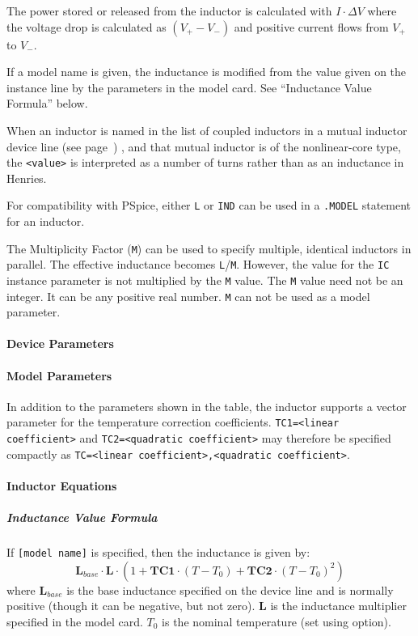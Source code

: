 \begin{Device}
The power stored or released from the inductor is calculated 
with $I \cdot \Delta V$ where the voltage drop is calculated as $(V_+ - V_-)$ 
and positive current flows from $V_+$ to $V_-$.

If a model name is given, the inductance is modified from the value
given on the instance line by the parameters in the model card.  See
``Inductance Value Formula'' below.

When an inductor is named in the list of coupled inductors in a mutual
inductor device line (see page~\pageref{MutualInductor}) , and that
mutual inductor is of the nonlinear-core type, the \verb+<value>+ is
interpreted as a number of turns rather than as an inductance in
Henries.

For compatibility with PSpice, either \texttt{L} or \texttt{IND} can be used in a
\texttt{.MODEL} statement for an inductor. 

The Multiplicity Factor (\texttt{M}) can be used to specify multiple, identical 
inductors in parallel. The effective inductance becomes \texttt{L}/\texttt{M}.
However, the value for the \texttt{IC} instance parameter is not multiplied by 
the \texttt{M} value. The \texttt{M} value need not be an integer.  It can be 
any positive real number. \texttt{M} can not be used as a model parameter.

\end{Device}

\newpage

\paragraph{Device Parameters}


\paragraph{Model Parameters}


In addition to the parameters shown in the table, the inductor supports a vector parameter for the temperature correction coefficients.  \texttt{TC1=<linear coefficient>} and \texttt{TC2=<quadratic coefficient>} may therefore be specified compactly as \texttt{TC=<linear coefficient>,<quadratic coefficient>}.

\paragraph{Inductor Equations}

\subparagraph{Inductance Value Formula}
If \verb+[model name]+ is specified, then the inductance is given by:
\[\mathbf{L}_{base} \cdot \mathbf{L} \cdot (1 + \mathbf{TC1} \cdot (T - T_{0}) +
\mathbf{TC2} \cdot (T - T_{0})^{2})\]
where \texttt{$\mathbf{L}_{base}$} is the base inductance specified on the device line and is normally positive (though it can be
negative, but not zero).  $\mathbf{L}$ is the inductance multiplier specified in the model card.  $T_0$ is the nominal temperature (set using
 option).

